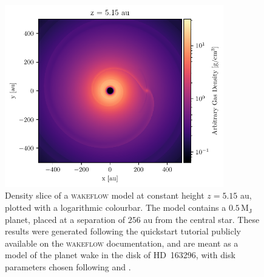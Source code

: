 \begin{figure}
    \centering
    \includegraphics[width = 0.85\textwidth]{figures/wakeflow_tutorial_plot.pdf}
    \caption{Density slice of a \textsc{wakeflow} model at constant height $z=5.15$ au, plotted with a logarithmic colourbar. The model contains a $0.5 \, \mathrm{M_J}$ planet, placed at a separation of $256$ au from the central star. These results were generated following the quickstart tutorial publicly available on the \textsc{wakeflow} documentation\protect\footnotemark, and are meant as a model of the planet wake in the disk of HD~163296, with disk parameters chosen following \citet{pinte2018a} and \citet{calcino2022}.}
    \label{fig:example_model}
\end{figure}



